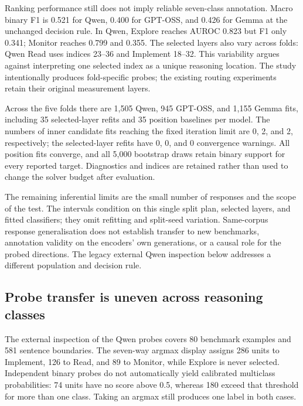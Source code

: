 \documentclass[12pt,a4paper,twoside,openright]{book}
\begin{document}


Ranking performance still does not imply reliable seven-class annotation.
Macro binary F1 is 0.521 for Qwen, 0.400 for GPT-OSS, and 0.426 for
Gemma at the unchanged decision rule. In Qwen, Explore reaches AUROC 0.823
but F1 only 0.341; Monitor reaches 0.799 and 0.355. The selected layers also
vary across folds: Qwen Read uses indices 23--36 and Implement 18--32.
This variability argues against interpreting one selected index as a unique
reasoning location. The study intentionally produces fold-specific probes;
the existing routing experiments retain their original measurement layers.

Across the five folds there are 1,505 Qwen, 945 GPT-OSS, and 1,155 Gemma
fits, including 35 selected-layer refits and 35 position baselines per model.
The numbers of inner candidate fits reaching the fixed iteration limit are
0, 2, and 2, respectively; the selected-layer refits
have 0, 0, and 0 convergence warnings.
All position fits converge, and all 5,000 bootstrap draws retain binary
support for every reported target. Diagnostics and indices are retained
rather than used to change the solver budget after evaluation.

The remaining inferential limits are the small number of responses and the
scope of the test. The intervals condition on this single split plan,
selected layers, and fitted classifiers; they omit refitting and split-seed
variation. Same-corpus response generalisation does not establish transfer
to new benchmarks, annotation validity on the encoders' own generations,
or a causal role for the probed directions. The legacy external Qwen
inspection below addresses a different population and decision rule.

\subsection{Probe transfer is uneven across reasoning classes}

The external inspection of the Qwen probes covers 80 benchmark examples and
581 sentence boundaries. The seven-way argmax display assigns 286 units to
Implement, 126 to Read, and 89 to Monitor, while Explore is never selected.
Independent binary probes do not automatically yield calibrated multiclass
probabilities: 74 units have no score above 0.5, whereas 180 exceed that
threshold for more than one class. Taking an argmax still produces one label
in both cases.
\end{document}
